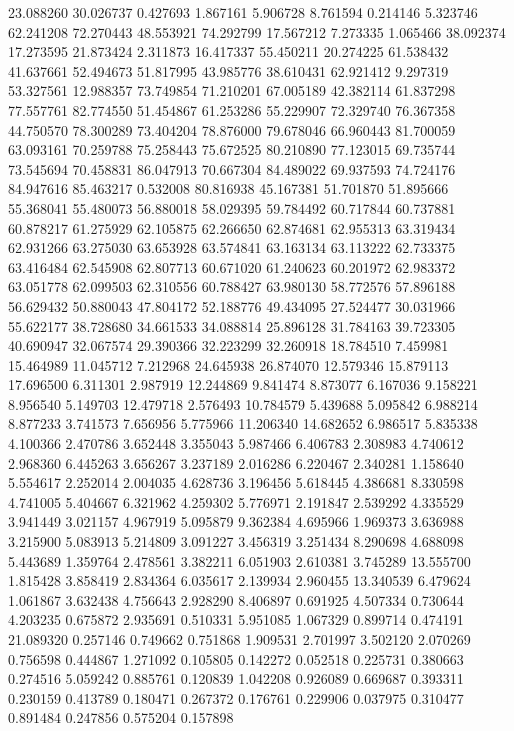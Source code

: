23.088260
30.026737
0.427693
1.867161
5.906728
8.761594
0.214146
5.323746
62.241208
72.270443
48.553921
74.292799
17.567212
7.273335
1.065466
38.092374
17.273595
21.873424
2.311873
16.417337
55.450211
20.274225
61.538432
41.637661
52.494673
51.817995
43.985776
38.610431
62.921412
9.297319
53.327561
12.988357
73.749854
71.210201
67.005189
42.382114
61.837298
77.557761
82.774550
51.454867
61.253286
55.229907
72.329740
76.367358
44.750570
78.300289
73.404204
78.876000
79.678046
66.960443
81.700059
63.093161
70.259788
75.258443
75.672525
80.210890
77.123015
69.735744
73.545694
70.458831
86.047913
70.667304
84.489022
69.937593
74.724176
84.947616
85.463217
0.532008
80.816938
45.167381
51.701870
51.895666
55.368041
55.480073
56.880018
58.029395
59.784492
60.717844
60.737881
60.878217
61.275929
62.105875
62.266650
62.874681
62.955313
63.319434
62.931266
63.275030
63.653928
63.574841
63.163134
63.113222
62.733375
63.416484
62.545908
62.807713
60.671020
61.240623
60.201972
62.983372
63.051778
62.099503
62.310556
60.788427
63.980130
58.772576
57.896188
56.629432
50.880043
47.804172
52.188776
49.434095
27.524477
30.031966
55.622177
38.728680
34.661533
34.088814
25.896128
31.784163
39.723305
40.690947
32.067574
29.390366
32.223299
32.260918
18.784510
7.459981
15.464989
11.045712
7.212968
24.645938
26.874070
12.579346
15.879113
17.696500
6.311301
2.987919
12.244869
9.841474
8.873077
6.167036
9.158221
8.956540
5.149703
12.479718
2.576493
10.784579
5.439688
5.095842
6.988214
8.877233
3.741573
7.656956
5.775966
11.206340
14.682652
6.986517
5.835338
4.100366
2.470786
3.652448
3.355043
5.987466
6.406783
2.308983
4.740612
2.968360
6.445263
3.656267
3.237189
2.016286
6.220467
2.340281
1.158640
5.554617
2.252014
2.004035
4.628736
3.196456
5.618445
4.386681
8.330598
4.741005
5.404667
6.321962
4.259302
5.776971
2.191847
2.539292
4.335529
3.941449
3.021157
4.967919
5.095879
9.362384
4.695966
1.969373
3.636988
3.215900
5.083913
5.214809
3.091227
3.456319
3.251434
8.290698
4.688098
5.443689
1.359764
2.478561
3.382211
6.051903
2.610381
3.745289
13.555700
1.815428
3.858419
2.834364
6.035617
2.139934
2.960455
13.340539
6.479624
1.061867
3.632438
4.756643
2.928290
8.406897
0.691925
4.507334
0.730644
4.203235
0.675872
2.935691
0.510331
5.951085
1.067329
0.899714
0.474191
21.089320
0.257146
0.749662
0.751868
1.909531
2.701997
3.502120
2.070269
0.756598
0.444867
1.271092
0.105805
0.142272
0.052518
0.225731
0.380663
0.274516
5.059242
0.885761
0.120839
1.042208
0.926089
0.669687
0.393311
0.230159
0.413789
0.180471
0.267372
0.176761
0.229906
0.037975
0.310477
0.891484
0.247856
0.575204
0.157898
